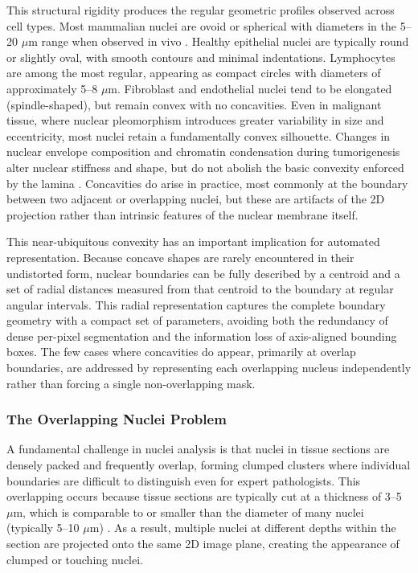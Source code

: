 This structural rigidity produces the regular geometric profiles observed across cell types. Most mammalian nuclei are ovoid or spherical with diameters in the 5--20 $\mu$m range when observed in vivo \cite{lammerding2011mechanics}. Healthy epithelial nuclei are typically round or slightly oval, with smooth contours and minimal indentations. Lymphocytes are among the most regular, appearing as compact circles with diameters of approximately 5--8 $\mu$m. Fibroblast and endothelial nuclei tend to be elongated (spindle-shaped), but remain convex with no concavities. Even in malignant tissue, where nuclear pleomorphism introduces greater variability in size and eccentricity, most nuclei retain a fundamentally convex silhouette. Changes in nuclear envelope composition and chromatin condensation during tumorigenesis alter nuclear stiffness and shape, but do not abolish the basic convexity enforced by the lamina \cite{lammerding2011mechanics}. Concavities do arise in practice, most commonly at the boundary between two adjacent or overlapping nuclei, but these are artifacts of the 2D projection rather than intrinsic features of the nuclear membrane itself.

This near-ubiquitous convexity has an important implication for automated representation. Because concave shapes are rarely encountered in their undistorted form, nuclear boundaries can be fully described by a centroid and a set of radial distances measured from that centroid to the boundary at regular angular intervals. This radial representation captures the complete boundary geometry with a compact set of parameters, avoiding both the redundancy of dense per-pixel segmentation and the information loss of axis-aligned bounding boxes. The few cases where concavities do appear, primarily at overlap boundaries, are addressed by representing each overlapping nucleus independently rather than forcing a single non-overlapping mask.

\subsubsection{The Overlapping Nuclei Problem}

A fundamental challenge in nuclei analysis is that nuclei in tissue sections are densely packed and frequently overlap, forming clumped clusters where individual boundaries are difficult to distinguish even for expert pathologists. This overlapping occurs because tissue sections are typically cut at a thickness of 3--5 $\mu$m, which is comparable to or smaller than the diameter of many nuclei (typically 5--10 $\mu$m) \cite{lammerding2011mechanics}. As a result, multiple nuclei at different depths within the section are projected onto the same 2D image plane, creating the appearance of clumped or touching nuclei.

